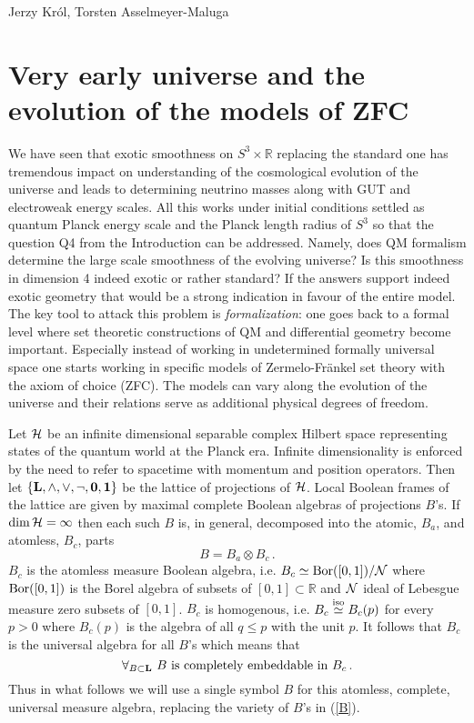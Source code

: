 \begin{artengenv2auth}{Jerzy Kr\'ol, Torsten Asselmeyer-Maluga}
\section{Very early universe and the evolution of the models of ZFC}
We have seen that exotic smoothness on $S^3\times \mathbb{R}$ replacing the standard one has tremendous impact on understanding of the cosmological evolution of the universe and leads to determining neutrino masses along with GUT and electroweak energy scales. All this works under initial conditions settled as quantum Planck energy scale and the Planck length radius of $S^3$ so that the question Q4 from the Introduction can be addressed. Namely, does QM formalism determine the large scale smoothness of the evolving universe? Is this smoothness in dimension 4 indeed exotic or rather standard? If the answers support indeed exotic geometry that would be a strong indication in favour of the entire model. The key tool to attack this problem is {\em formalization}: one goes back to a formal level where set theoretic constructions of QM and differential geometry become important. Especially instead of working in undetermined formally universal space one starts working in specific models of Zermelo-Fr\"ankel set theory with the axiom of choice (ZFC). The models can vary along the evolution of the universe and their relations serve as additional physical degrees of freedom. 

Let ${\cal H}$ be an infinite dimensional separable complex Hilbert space representing states of the quantum world at the Planck era. Infinite dimensionality is enforced by the need to refer to spacetime with momentum and position operators. Then let $\{\bf{L},\wedge,\vee,\neg, 0,1\}$ be the lattice of projections of ${\cal H}$. Local Boolean frames of the lattice are given by maximal complete Boolean algebras of projections $B$'s. If $\dim {\cal H}=\infty $ then each such $B$ is, in general, decomposed into the atomic, $B_a$, and atomless, $B_c$, parts \parencite{Kappos1969}
\begin{equation}\label{B} B=B_a \otimes B_c\,. \end{equation}
$B_c$ is the atomless measure Boolean algebra, i.e. $B_c\simeq {\rm Bor}([0,1])/{\cal N}$ where ${\rm Bor}([0,1])$ is the Borel algebra of subsets of $[0,1]\subset \mathbb{R}$ and ${\cal N}$ ideal of Lebesgue measure zero subsets of $[0,1]$. $B_c$ is homogenous, i.e. $B_c \overset{\rm iso}{\simeq} B_c(p)$ for every $p>0$ where $B_c(p)$ is the algebra of all $q\leq p$ with the unit $p$. It follows that $B_c$ is the universal algebra for all $B$'s which means that 
\[ \forall_{B\subset {\bf L}}\ B{\text{ is completely embeddable in }} B_c \,.\]
Thus in what follows we will use a single symbol $B$ for this atomless, complete, universal measure algebra, replacing the variety of $B$'s in (\ref{B}). 


\end{artengenv2auth}
